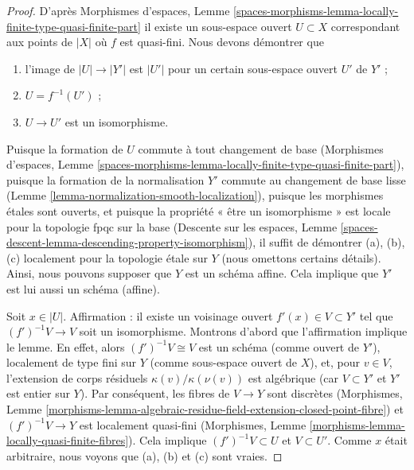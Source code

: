 \begin{proof}
D'après Morphismes d'espaces, Lemme
\ref{spaces-morphisms-lemma-locally-finite-type-quasi-finite-part}
il existe un sous-espace ouvert $U \subset X$ correspondant aux points
de $|X|$ où $f$ est quasi-fini. Nous devons démontrer que
\begin{enumerate}
\item[(a)] l'image de $|U| \to |Y'|$ est $|U'|$ pour un certain sous-espace ouvert
$U'$ de $Y'$ ;
\item[(b)] $U = f^{-1}(U')$ ;
\item[(c)] $U \to U'$ est un isomorphisme.
\end{enumerate}
Puisque la formation de $U$ commute à tout changement de base
(Morphismes d'espaces, Lemme
\ref{spaces-morphisms-lemma-locally-finite-type-quasi-finite-part}),
puisque la formation de la normalisation $Y'$ commute au changement de base
lisse (Lemme \ref{lemma-normalization-smooth-localization}),
puisque les morphismes étales sont ouverts, et
puisque la propriété « être un isomorphisme » est locale pour la topologie fpqc sur la base
(Descente sur les espaces, Lemme
\ref{spaces-descent-lemma-descending-property-isomorphism}),
il suffit de démontrer (a), (b), (c) localement pour la topologie étale sur $Y$
(nous omettons certains détails). Ainsi,
nous pouvons supposer que $Y$ est un schéma affine. Cela implique que $Y'$ est
lui aussi un schéma (affine).

\medskip\noindent
Soit $x \in |U|$. Affirmation : il existe un voisinage
ouvert $f'(x) \in V \subset Y'$ tel que $(f')^{-1}V \to V$ soit un
isomorphisme. Montrons d'abord que l'affirmation implique le lemme.
En effet, alors $(f')^{-1}V \cong V$ est un schéma (comme ouvert
de $Y'$), localement de type fini sur $Y$ (comme sous-espace ouvert de $X$),
et, pour $v \in V$, l'extension de corps résiduels
$\kappa(v)/\kappa(\nu(v))$ est algébrique (car
$V \subset Y'$ et $Y'$ est entier sur $Y$). Par conséquent, les fibres
de $V \to Y$ sont discrètes (Morphismes, Lemme
\ref{morphisms-lemma-algebraic-residue-field-extension-closed-point-fibre})
et $(f')^{-1}V \to Y$ est localement quasi-fini
(Morphismes, Lemme \ref{morphisms-lemma-locally-quasi-finite-fibres}).
Cela implique $(f')^{-1}V \subset U$ et $V \subset U'$. Comme $x$ était
arbitraire, nous voyons que (a), (b) et (c) sont vraies.


\end{proof}
